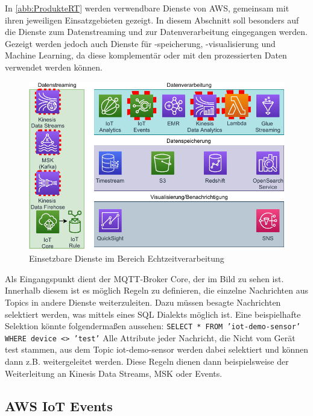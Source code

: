 In \autoref{abb:ProdukteRT} werden verwendbare Dienste von \ac{AWS}, gemeinsam mit ihren jeweiligen Einsatzgebieten gezeigt. In diesem Abschnitt soll besonders auf die Dienste zum Datenstreaming und zur Datenverarbeitung eingegangen werden. Gezeigt werden jedoch auch Dienste für -speicherung, -visualisierung und Machine Learning, da diese komplementär oder mit den prozessierten Daten verwendet werden können.
\begin{figure}[H]
\centering
\includegraphics[width=\textwidth]{graphics/Overview-Realtime.pdf}
\caption{Einsetzbare Dienste im Bereich Echtzeitverarbeitung}
\label{abb:ProdukteRT}
\end{figure}

Als Eingangspunkt dient der \ac{MQTT}-Broker \AWSIOT{} Core, der im Bild zu sehen ist. Innerhalb diesem ist es möglich Regeln zu definieren, die einzelne Nachrichten aus Topics in andere Dienste weiterzuleiten. Dazu müssen besagte Nachrichten selektiert werden, was mittels eines SQL Dialekts möglich ist. Eine beispielhafte Selektion könnte folgendermaßen aussehen: \texttt{SELECT * FROM 'iot-demo-sensor' WHERE device <> 'test'}
Alle Attribute jeder Nachricht, die Nicht vom Gerät test stammen, aus dem Topic iot-demo-sensor werden dabei selektiert und können dann z.B. weitergeleitet werden. Diese Regeln dienen dann beispielsweise der Weiterleitung an Kinesis Data Streams, \ac{MSK} oder \AWSIOT{} Events.

\subsection{AWS IoT Events}




